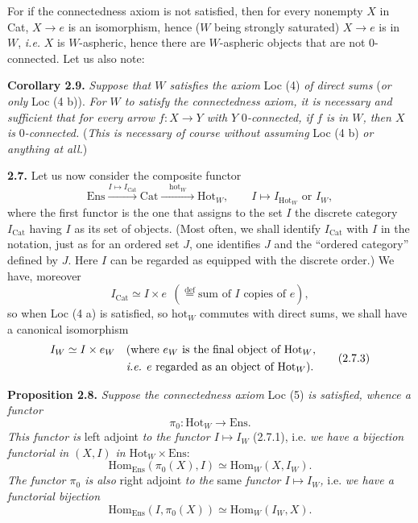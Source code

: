 For if the connectedness axiom is not satisfied, then for every nonempty $X$ in Cat, $X \longrightarrow e$ is an isomorphism, hence ($W$ being strongly saturated) $X \longrightarrow e$ is in $W$, \textit{i.e.} $X$ is $W$-aspheric, hence there are $W$-aspheric objects that are not 0-connected. Let us also note: %

\textbf{Corollary 2.9.} \textit{Suppose that $W$ satisfies the axiom} Loc (4) \textit{of direct sums} (\textit{or only} Loc (4 b)). \textit{For $W$ to satisfy the connectedness axiom, it is necessary and sufficient that for every arrow $f : X \longrightarrow Y$ with $Y$} 0\textit{-connected, if $f$ is in $W$, then $X$ is} 0\textit{-connected.} (\textit{This is necessary of course without assuming} Loc (4 b) \textit{or anything at all.})


\textbf{2.7.} Let us now consider the composite functor
\[
\mathrm{Ens} \xrightarrow{I \longmapsto I_{\mathrm{Cat}}} \mathrm{Cat} \xrightarrow{\quad \mathrm{hot}_W \quad} \mathrm{Hot}_W, \qquad I \longmapsto I_{\mathrm{Hot}_W} \text{ or } I_W, \tag*{(2.7.1)}
\]
where the first functor is the one that assigns to the set $I$ the discrete category $I_{\mathrm{Cat}}$ having $I$ as its set of objects. (Most often, we shall identify $I_{\mathrm{Cat}}$ with $I$ in the notation, just as for an ordered set $J$, one identifies $J$ and the ``ordered category'' %
defined by $J$. Here $I$ can be regarded as equipped with the discrete order.) We have, moreover
\[
I_{\mathrm{Cat}} \simeq I \times e \ \ (\overset{\text{def}}{=} \text{sum of $I$ copies of $e$}), \tag*{(2.7.2)}
\]
so when Loc (4 a) is satisfied, so $\mathrm{hot}_W$ commutes with direct sums, we shall have a canonical isomorphism
\[
\begin{aligned}
I_W \simeq I \times e_W \quad &\text{(where $e_W$ is the final object of $\mathrm{Hot}_W$,} \\
&\text{\textit{i.e.} $e$ regarded as an object of $\mathrm{Hot}_W$).}
\end{aligned} \tag*{(2.7.3)}
\]

\textbf{Proposition 2.8.} \textit{Suppose the connectedness axiom} Loc (5) \textit{is satisfied, whence a functor}
\[
\pi_0 : \mathrm{Hot}_W \longrightarrow \mathrm{Ens}. \tag*{(2.8.1)}
\]
\textit{This functor is} left adjoint \textit{to the functor $I \longmapsto I_W$} (2.7.1), i.e. \textit{we have a bijection functorial in $(X, I)$ in} $\mathrm{Hot}_W \times \mathrm{Ens}$:
\[
\mathrm{Hom}_{\mathrm{Ens}}(\pi_0(X), I) \simeq \mathrm{Hom}_W(X, I_W). \tag*{(2.8.2)}
\]
\textit{The functor $\pi_0$ is also} right adjoint \textit{to the} same \textit{functor $I \longmapsto I_W$,} i.e. \textit{we have a functorial bijection} %
\[
\mathrm{Hom}_{\mathrm{Ens}}(I, \pi_0(X)) \simeq \mathrm{Hom}_W(I_W, X). \tag*{(2.8.3)}
\]


